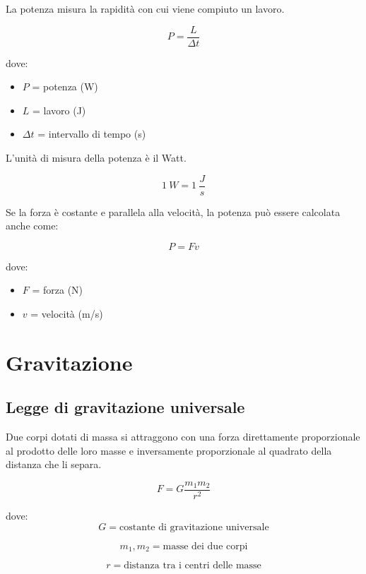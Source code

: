 \noindent
La potenza misura la rapidità con cui viene compiuto un lavoro.

\[
\boxed{P=\frac{L}{\Delta t}}
\]

\noindent
dove:

\begin{itemize}
    \item $P$ = potenza (W)
    \item $L$ = lavoro (J)
    \item $\Delta t$ = intervallo di tempo (s)
\end{itemize}

\noindent
L'unità di misura della potenza è il Watt.

\[
1\ W=1\ \frac{J}{s}
\]

\vspace{0.3cm}

\noindent
Se la forza è costante e parallela alla velocità, la potenza può essere calcolata anche come:

\[
\boxed{P=Fv}
\]

\noindent
dove:

\begin{itemize}
    \item $F$ = forza (N)
    \item $v$ = velocità (m/s)
\end{itemize}

\vspace{0.3cm}
\section{Gravitazione}

\subsection{Legge di gravitazione universale}

\noindent Due corpi dotati di massa si attraggono con una forza direttamente proporzionale al prodotto delle loro masse e inversamente proporzionale al quadrato della distanza che li separa.

\[
F=G\frac{m_1m_2}{r^2}
\]

\noindent dove:
\[
G=\text{costante di gravitazione universale}
\]

\[
m_1,m_2=\text{masse dei due corpi}
\]

\[
r=\text{distanza tra i centri delle masse}
\]

\vspace{0.3cm}

